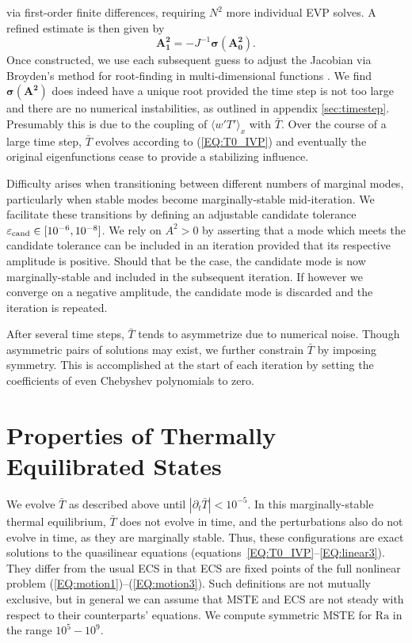 \documentclass[reprint,amsmath,amssymb,aps]{revtex4-1}
\newcommand\Ra{\mathrm{Ra}}
\renewcommand{\vec}[1]{\boldsymbol{#1}}
\newcommand{\eq}[1]{(\ref{#1})}
\newcommand{\eqss}[2]{(\ref{#1})--(\ref{#2})}
\begin{document}
via first-order finite differences, requiring $N^2$ more individual EVP solves.
A refined estimate is then given by
\begin{equation}
    \vec{A^2_1} = -J^{-1} \vec{\sigma}(\vec{A^2_0}).
\end{equation}
Once constructed, we use each subsequent guess to adjust the Jacobian via Broyden's method for root-finding in multi-dimensional functions \cite{Broyden}.
We find $\vec{\sigma}(\vec{A^2})$ does indeed have a unique root provided the time step is not too large and there are no numerical instabilities, as outlined in appendix \ref{sec:timestep}.
Presumably this is due to the coupling of $\langle w'T' \rangle_x$ with $\bar{T}$.
Over the course of a large time step, $\bar{T}$ evolves according to \eq{EQ:T0_IVP} and eventually the original eigenfunctions cease to provide a stabilizing influence.

Difficulty arises when transitioning between different numbers of marginal modes, particularly when stable modes become marginally-stable mid-iteration.
We facilitate these transitions by defining an adjustable candidate tolerance $\varepsilon_{\rm{cand}} \in [10^{-6}, 10^{-8}]$.
We rely on $A^2 > 0$ by asserting that a mode which meets the candidate tolerance can be included in an iteration provided that its respective amplitude is positive.
Should that be the case, the candidate mode is now marginally-stable and included in the subsequent iteration.
If however we converge on a negative amplitude, the candidate mode is discarded and the iteration is repeated. 

After several time steps, $\bar{T}$ tends to asymmetrize due to numerical noise. 
Though asymmetric pairs of solutions may exist, we further constrain $\bar{T}$ by imposing symmetry. 
This is accomplished at the start of each iteration by setting the coefficients of even Chebyshev polynomials to zero.

\section{Properties of Thermally Equilibrated States}\label{sec:properties}
We evolve $\bar{T}$ as described above until $|\partial_{t}\bar{T}| < 10^{-5}$.
In this marginally-stable thermal equilibrium, $\bar{T}$ does not evolve in time, and the perturbations also do not evolve in time, as they are marginally stable.
Thus, these configurations are exact solutions to the quasilinear equations (equations~\ref{EQ:T0_IVP}--\ref{EQ:linear3}).
They differ from the usual ECS in that ECS are fixed points of the full nonlinear problem \eqss{EQ:motion1}{EQ:motion3}. 
Such definitions are not mutually exclusive, but in general we can assume that MSTE and ECS are not steady with respect to their counterparts' equations.
We compute symmetric MSTE for $\Ra$ in the range $10^5 - 10^9$.
\end{document}
